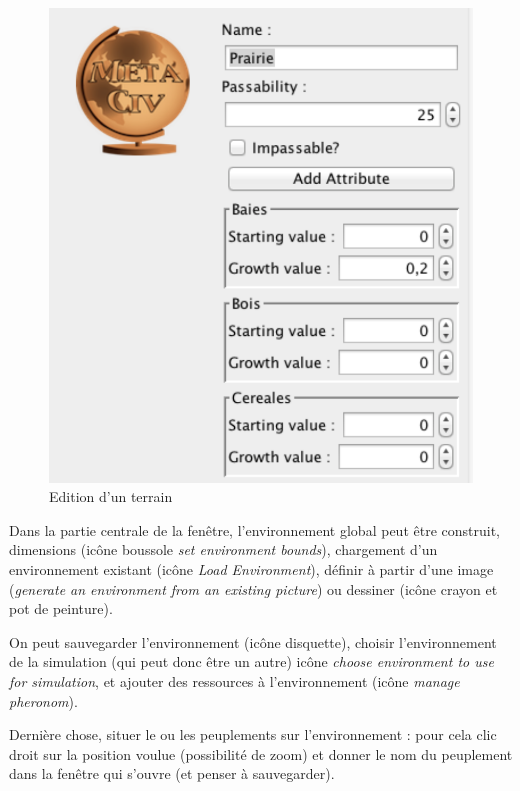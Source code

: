 \begin{figure}[!ht]
	\begin{center}
	\includegraphics[scale=0.5]{DocumentationSimulation/terrain.pdf}
	\caption[Ter]{Edition d'un terrain \\}
	\label{Ter}
	\end{center}
	\end{figure}



Dans la partie centrale de la fenêtre, l'environnement global peut être construit, dimensions (icône boussole \textit{set environment bounds}), chargement d'un environnement existant (icône \textit{Load Environment}), définir à partir d'une image (\textit{generate an environment from an existing picture}) ou dessiner (icône crayon et pot de peinture). 

On peut sauvegarder l'environnement (icône disquette), choisir l'environnement de la simulation (qui peut donc être un autre) icône \textit{choose environment to use for simulation}, et ajouter des ressources à l'environnement (icône \textit{manage pheronom}).


Dernière chose, situer le ou les peuplements sur l'environnement : pour cela clic droit sur la position voulue (possibilité de zoom) et donner le nom du peuplement dans la fenêtre qui s'ouvre (et penser à sauvegarder).

